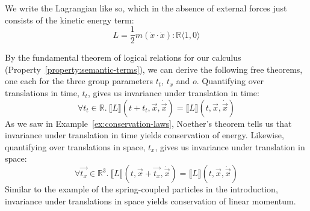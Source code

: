 \documentclass{sigplanconf}
\theoremstyle{examplestyle}
\newcommand{\sem}[1]{\llbracket #1 \rrbracket}
\begin{document}
We write the Lagrangian like so, which in the absence of external
forces just consists of the kinetic energy term:
\begin{displaymath}
  L = \frac{1}{2}m(\dot{x} \cdot \dot{x}) : \mathbb{R}\langle 1, 0 \rangle
\end{displaymath}

By the fundamental theorem of logical relations for our calculus
(Property~\ref{property:semantic-terms}), we can derive the following
free theorems, one each for the three group parameters $t_t$, $t_x$
and $o$. Quantifying over translations in time, $t_t$, gives us
invariance under translation in time:
\begin{displaymath}
  \forall t_t \in \mathbb{R}.~\sem{L}(t + t_t, \vec{x}, \dot{\vec{x}}) = \sem{L}(t, \vec{x}, \dot{\vec{x}})
\end{displaymath}
As we saw in Example~\ref{ex:conservation-laws}, Noether's theorem
tells us that invariance under translation in time yields conservation
of energy. Likewise, quantifying over translations in space, $t_x$,
gives us invariance under translation in space:
\begin{displaymath}
  \forall \vec{t_x} \in \mathbb{R}^3.~\sem{L}(t, \vec{x} + \vec{t_x}, \dot{\vec{x}}) = \sem{L}(t, \vec{x}, \dot{\vec{x}})
\end{displaymath}
Similar to the example of the spring-coupled particles in the
introduction, invariance under translations in space yields
conservation of linear momentum.
\end{document}
